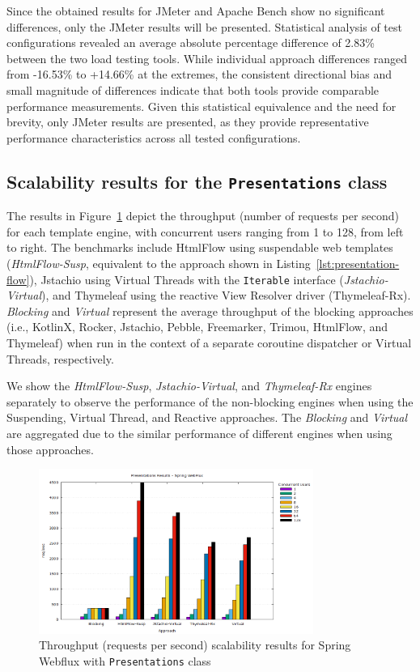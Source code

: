 Since the obtained results for JMeter and Apache Bench show no significant
differences, only the JMeter results will be presented. Statistical analysis of
test configurations revealed an average absolute percentage difference of
2.83\% between the two load testing tools. While individual approach
differences ranged from -16.53\% to +14.66\% at the extremes, the consistent
directional bias and small magnitude of differences indicate that both tools
provide comparable performance measurements. Given this statistical equivalence
and the need for brevity, only JMeter results are presented, as they provide
representative performance characteristics across all tested configurations.

\subsection{Scalability results for the \texttt{Presentations} class}

The results in Figure~\ref{fig:presentations-webflux-jmeter} depict the
throughput (number of requests per second) for each template engine, with
concurrent users ranging from 1 to 128, from left to right. The benchmarks
include HtmlFlow using suspendable web templates (\textit{HtmlFlow-Susp},
equivalent to the approach shown in Listing~\ref{lst:presentation-flow}),
Jstachio using Virtual Threads with the \texttt{Iterable} interface
(\textit{Jstachio-Virtual}), and Thymeleaf using the reactive View Resolver
driver (Thymeleaf-Rx). \textit{Blocking} and \textit{Virtual} represent the
average throughput of the blocking approaches (i.e., KotlinX, Rocker, Jstachio,
Pebble, Freemarker, Trimou, HtmlFlow, and Thymeleaf) when run in the context of
a separate coroutine dispatcher or Virtual Threads, respectively.

We show the \textit{HtmlFlow-Susp}, \textit{Jstachio-Virtual}, and
\textit{Thymeleaf-Rx} engines separately to observe the performance of the
non-blocking engines when using the Suspending, Virtual Thread, and Reactive
approaches. The \textit{Blocking} and \textit{Virtual} are aggregated due to
the similar performance of different engines when using those approaches.

\begin{figure}[h]
     \centering
     \includegraphics[width=0.8\textwidth]{./Graphs/presentations-webflux-jmeter.png}
     \caption{Throughput (requests per second) scalability results for Spring Webflux with \texttt{Presentations} class}\label{fig:presentations-webflux-jmeter}
\end{figure}

